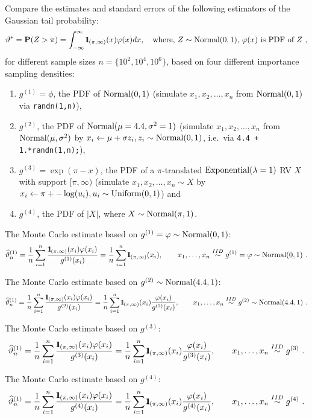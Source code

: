 \begin{labwork}[Estimating $\p(Z>\pi)$]\label{LW:GaussianTailProbs}
Compare the estimates and standard errors of the following estimators of the Gaussian tail probability: 
$$
\vartheta^* = \mathbf{P}(Z>\pi) = \int_{-\infty}^{\infty} {1}\mspace{-11 mu}{1}_{(\pi,\infty)}(x) \varphi(x) dx, \quad \text{where, $Z \sim \mbox{{\rm Normal}}(0,1)$, $\varphi(x)$ is PDF of $Z$} \ ,
$$
for different sample sizes $n=\{10^2,10^4, 10^6\}$, based on four different importance sampling densities:
\begin{enumerate}
\item $g^{(1)}=\phi$, the PDF of $\mbox{{\rm Normal}}(0,1)$ (simulate $x_1,x_2,\ldots,x_n$ from $\mbox{{\rm Normal}}(0,1)$ via {\tt randn(1,n)}), 
\item $g^{(2)}$, the PDF of $\mbox{{\rm Normal}}(\mu=4.4,\sigma^2=1)$ (simulate $x_1,x_2,\ldots,x_n$ from $\mbox{{\rm Normal}}(\mu,\sigma^2)$ by $x_i \gets \mu + \sigma z_i, z_i \sim \mbox{{\rm Normal}}(0,1)$, i.e.~via {\tt 4.4 + 1.*randn(1,n);}),
\item $g^{(3)} = \exp(\pi - x)$, the PDF of a $\pi$-translated $\mbox{{\rm Exponential}}(\lambda=1)$ RV $X$ with support $[\pi,\infty)$ (simulate $x_1,x_2,\ldots,x_n \sim X$ by $x_i \gets \pi + -\log(u_i), u_i \sim \mbox{{\rm Uniform}}(0,1)$) and
\item $g^{(4)}$, the PDF of $|X|$, where $X \sim \mbox{{\rm Normal}}(\pi,1)$.
\end{enumerate}

The Monte Carlo estimate based on $g^{(1)}=\varphi \sim \mbox{{\rm Normal}}(0,1)$:
\[
\widehat{\vartheta}^{(1)}_n 
= \frac{1}{n} \sum_{i=1}^n \frac{\BB{1}_{(\pi,\infty)}(x_i) \phi(x_i)}{g^{(1)}(x_i)}
= \frac{1}{n} \sum_{i=1}^n \BB{1}_{(\pi,\infty)}(x_i), \qquad x_1,\ldots,x_n \overset{IID}{\sim} g^{(1)} = \phi \sim \normal(0,1) \ .
\] 

The Monte Carlo estimate based on $g^{(2)} \sim \mbox{{\rm Normal}}(4.4,1)$:
\[
\widehat{\vartheta}^{(1)}_n 
= \frac{1}{n} \sum_{i=1}^n \frac{\BB{1}_{(\pi,\infty)}(x_i) \phi(x_i)}{g^{(2)}(x_i)}
= \frac{1}{n} \sum_{i=1}^n \BB{1}_{(\pi,\infty)}(x_i)\frac{\phi(x_i)}{g^{(2)}(x_i)}, \qquad x_1,\ldots,x_n \overset{IID}{\sim} g^{(2)} \sim \normal(4.4,1) \ .
\] 

The Monte Carlo estimate based on $g^{(3)}$:
\[
\widehat{\vartheta}^{(1)}_n 
= \frac{1}{n} \sum_{i=1}^n \frac{{1}\mspace{-11 mu}{1}_{(\pi,\infty)}(x_i) \varphi(x_i)}{g^{(3)}(x_i)}
= \frac{1}{n} \sum_{i=1}^n {1}\mspace{-11 mu}{1}_{(\pi,\infty)}(x_i)\frac{\varphi(x_i)}{g^{(3)}(x_i)}, \qquad x_1,\ldots,x_n \overset{IID}{\sim} g^{(3)} \ .
\] 

The Monte Carlo estimate based on $g^{(4)}$:
\[
\widehat{\vartheta}^{(1)}_n 
= \frac{1}{n} \sum_{i=1}^n \frac{{1}\mspace{-11 mu}{1}_{(\pi,\infty)}(x_i) \varphi(x_i)}{g^{(4)}(x_i)}
= \frac{1}{n} \sum_{i=1}^n {1}\mspace{-11 mu}{1}_{(\pi,\infty)}(x_i)\frac{\varphi(x_i)}{g^{(4)}(x_i)}, \qquad x_1,\ldots,x_n \overset{IID}{\sim} g^{(4)} \ .
\] 

\end{labwork}

